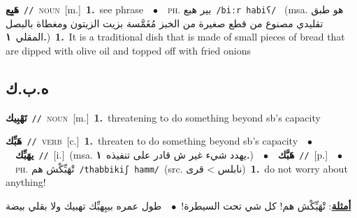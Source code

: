 \documentclass[10pt,a4paper,twoside]{article} %
\begin{document}
\begin{multicols}{2}
{{{{\setlength\topsep{0pt}\textbf{\foreignlanguage{arabic}{هَبِع}}\ {\color{gray}\texttt{//}\color{black}}\ \textsc{noun}\ [m.]\ \textbf{1.}~see phrase\ \ $\bullet$\ \ \textsc{ph.} \color{gray} \foreignlanguage{arabic}{بير هبع}\color{black}\ {\color{gray}\texttt{/{\sffamily biːr habiʕ}/}\color{black}}\ \color{gray} (msa. \foreignlanguage{arabic}{هو طبق تقليدي مصنوع من قطع صغيرة من الخبز مُغَمَّسة بزيت الزيتون ومغطاة بالبصل المقلي}~\foreignlanguage{arabic}{\textbf{١.}})\color{black}\ \textbf{1.}~It is a traditional dish that is made of small pieces of bread that are dipped with olive oil and topped off with fried onions\ 

\vspace{-3mm}
\subsection*{\color{blue}\foreignlanguage{arabic}{ه.ب.ك}\color{blue}{}} 

{\setlength\topsep{0pt}\textbf{\foreignlanguage{arabic}{تَهْبِيك}}\ {\color{gray}\texttt{//}\color{black}}\ \textsc{noun}\ [m.]\ \textbf{1.}~threatening to do something beyond sb's capacity\ 

{\setlength\topsep{0pt}\textbf{\foreignlanguage{arabic}{هَبِّك}}\ {\color{gray}\texttt{//}\color{black}}\ \textsc{verb}\ [c.]\ \textbf{1.}~threaten to do something beyond sb's capacity\ \ $\bullet$\ \ \setlength\topsep{0pt}\textbf{\foreignlanguage{arabic}{يهَبِّك}}\ {\color{gray}\texttt{//}\color{black}}\ [i.]\ \color{gray}(msa. \foreignlanguage{arabic}{يهدد شيء غير ش قادر على تنفيذه}~\foreignlanguage{arabic}{\textbf{١.}})\color{black}\ \ $\bullet$\ \ \setlength\topsep{0pt}\textbf{\foreignlanguage{arabic}{هَبَّك}}\ {\color{gray}\texttt{//}\color{black}}\ [p.]\ \ $\bullet$\ \ \textsc{ph.} \color{gray} \foreignlanguage{arabic}{تْهَبِّكْش هم}\color{black}\ {\color{gray}\texttt{/{\sffamily thabbikiʃ hamm}/}\color{black}}\ \color{gray}(src. \foreignlanguage{arabic}{نابلس > قرى})\color{black}\ \textbf{1.}~do not worry about anything!\  \begin{flushright}\color{gray}\foreignlanguage{arabic}{\textbf{\underline{\foreignlanguage{arabic}{أمثلة}}}: تْهَبِّكْش هم! كل شي تحت السيطرة!\ $\bullet$\ \  طول عمره بيبِهبِّك تهبيك ولا بقلي بيضة}\end{flushright}\color{black}} \vspace{2mm}

}}}}}
\end{multicols}
\end{document}
